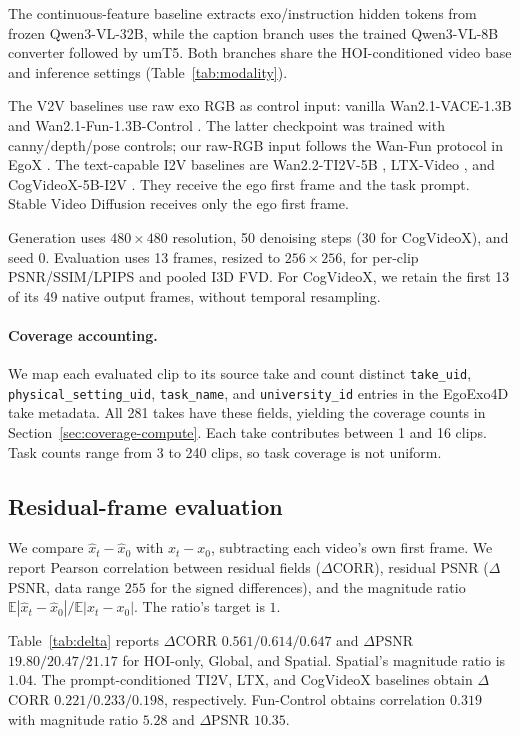 \documentclass{article} %
\begin{document}
The continuous-feature baseline extracts exo/instruction hidden tokens
from frozen Qwen3-VL-32B, while the caption branch uses the trained
Qwen3-VL-8B converter followed by umT5. Both branches share the
HOI-conditioned video base and inference settings
(Table~\ref{tab:modality}).

The V2V baselines use raw exo RGB as control input: vanilla
Wan2.1-VACE-1.3B and Wan2.1-Fun-1.3B-Control \citep{wan2025}.
The latter checkpoint was trained with canny/depth/pose controls; our raw-RGB
input follows the Wan-Fun protocol in EgoX \citep{kang2025egox}.
The text-capable I2V baselines are Wan2.2-TI2V-5B \citep{wan2025},
LTX-Video \citep{hacohen2025ltxvideo}, and CogVideoX-5B-I2V
\citep{yang2024cogvideox}. They receive the ego first frame and the task prompt. Stable Video Diffusion
\citep{blattmann2023svd} receives only the ego first frame.

Generation uses $480\times480$ resolution, 50 denoising steps
(30 for CogVideoX), and seed $0$. Evaluation uses 13 frames, resized to
$256\times256$, for per-clip PSNR/SSIM/LPIPS and pooled I3D FVD.
For CogVideoX, we retain the first 13 of its 49 native output frames,
without temporal resampling.

\paragraph{Coverage accounting.}
We map each evaluated clip to its source take and count distinct
\texttt{take\_uid}, \texttt{physical\_setting\_uid}, \texttt{task\_name}, and
\texttt{university\_id} entries in the EgoExo4D take metadata. All 281 takes
have these fields, yielding the coverage counts in
Section~\ref{sec:coverage-compute}. Each take contributes between 1 and 16
clips. Task counts range from 3 to 240 clips, so task coverage is not uniform.

\subsection{Residual-frame evaluation}
We compare $\hat{x}_t-\hat{x}_0$ with $x_t-x_0$, subtracting each
video's own first frame. We report Pearson correlation between residual
fields ($\Delta$CORR), residual PSNR ($\Delta$PSNR, data range $255$ for
the signed differences), and the magnitude ratio
$\mathbb{E}|\hat{x}_t-\hat{x}_0|/\mathbb{E}|x_t-x_0|$.
The ratio's target is $1$.

Table~\ref{tab:delta} reports $\Delta$CORR
$0.561/0.614/0.647$ and $\Delta$PSNR $19.80/20.47/21.17$
for HOI-only, Global, and Spatial. Spatial's magnitude ratio is $1.04$.
The prompt-conditioned TI2V, LTX, and CogVideoX baselines obtain
$\Delta$CORR $0.221/0.233/0.198$, respectively.
Fun-Control obtains correlation $0.319$ with magnitude ratio $5.28$
and $\Delta$PSNR $10.35$.
\end{document}
